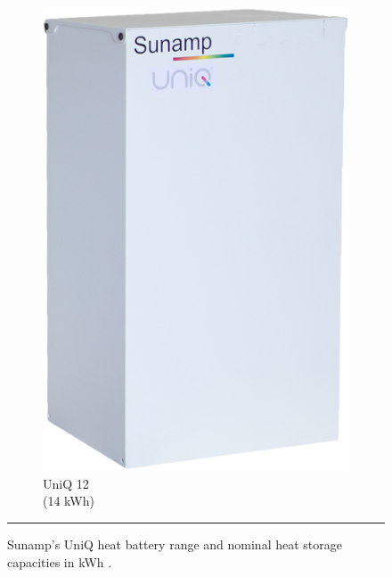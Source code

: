 \begin{figure}[htbp]
\begin{subfigure}{.24\textwidth}
		\includegraphics[width=\textwidth]{figures/sunamp-uniq-12.png}
		\caption{UniQ 12\\
			(14 kWh)}
		\label{fig:uniq12}
	\end{subfigure}
	\rule{\textwidth}{0.5pt} %
	\caption{Sunamp's UniQ heat battery range and nominal heat storage capacities in kWh \citep{SunampHomepage}.}
	\label{fig:uniq_range}
\end{figure}


